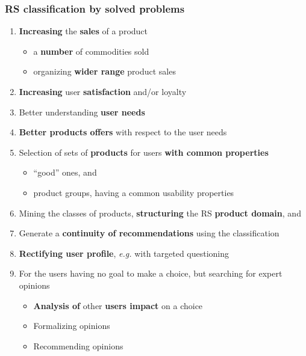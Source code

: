 \documentclass[10pt,dvipsnames]{beamer}
\begin{document}
\begin{frame}
  \frametitle{RS classification by solved problems}
  \begin{enumerate}
  \item \textbf{Increasing} the \textbf{sales} of a product
    \begin{itemize}
    \item a \textbf{number} of commodities sold
    \item organizing \textbf{wider range} product sales
    \end{itemize}
  \item \textbf{Increasing} user \textbf{satisfaction} and/or loyalty
  \item Better understanding \textbf{user needs}
  \item \textbf{Better products offers} with respect to the user needs
  \item Selection of sets of \textbf{products} for users \textbf{with common properties}
    \begin{itemize}
    \item ``good'' ones, and
    \item product groups, having a common usability properties
    \end{itemize}
  \item Mining the classes of products, \textbf{structuring} the RS \textbf{product domain}, and
  \item Generate a \textbf{continuity of recommendations} using the classification
  \item \textbf{Rectifying user profile}, \emph{e.g.} with targeted questioning
  \item For the users having no goal to make a choice, but searching for expert opinions
    \begin{itemize}
    \item \textbf{Analysis of} other \textbf{users impact} on a choice
    \item Formalizing opinions
    \item Recommending opinions
    \end{itemize}
  \end{enumerate}
\end{frame}
\end{document}
